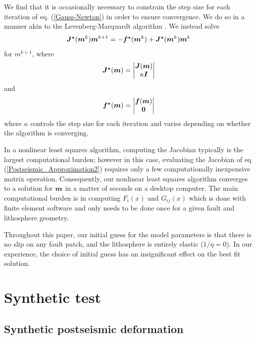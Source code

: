 \documentclass[extra]{gji}
\begin{document}
We find that it is occasionally necessary to constrain the step size
for each iteration of eq. (\ref{Gauss-Newton}) in order to ensure
convergence.  We do so in a manner akin to the Levenberg-Marquardt
algorithm \citep[e.g.][]{A2013}.  We instead solve
\begin{equation}\label{Levenberg-Marquardt}
  \mitbf{J^*}(\mitbf{m}^k)\mitbf{m}^{k+1} = -\mitbf{f^*}(\mitbf{m}^k) + \mitbf{J^*}(\mitbf{m}^k)\mitbf{m}^k
\end{equation}
for $m^{k+1}$, where
\begin{equation}
  \mitbf{J^*}(\mitbf{m}) = 
      \begin{vmatrix}
      \mitbf{J}(\mitbf{m})\\
      \kappa\mitbf{I}
      \end{vmatrix}
\end{equation}
and
\begin{equation}
  \mitbf{f^*}(\mitbf{m}) = 
      \begin{vmatrix}
      \mitbf{f}(\mitbf{m})\\
      \mitbf{0}
      \end{vmatrix}
\end{equation}
where $\kappa$ controls the step size for each iteration and varies
depending on whether the algorithm is converging.  

In a nonlinear least squares algorithm, computing the Jacobian
typically is the largest computational burden; however in this case,
evaluating the Jacobian of eq (\ref{Postseismic_Approximation2})
requires only a few computationally inexpensive matrix operation.
Consequently, our nonlinear least squares algorithm converges to a
solution for $\mitbf{m}$ in a matter of seconds on a desktop computer.
The main computational burden is in computing $F_i(x)$ and $G_{ij}(x)$
which is done with finite element software and only needs to be done
once for a given fault and lithosphere geometry.

Throughout this paper, our initial guess for the model parameters is
that there is no slip on any fault patch, and the lithosphere is
entirely elastic ($1/\eta = 0$).  In our experience, the choice of
initial guess has an insignificant effect on the best fit
solution.

\section{Synthetic test}
\subsection{Synthetic postseismic deformation}
\end{document}
